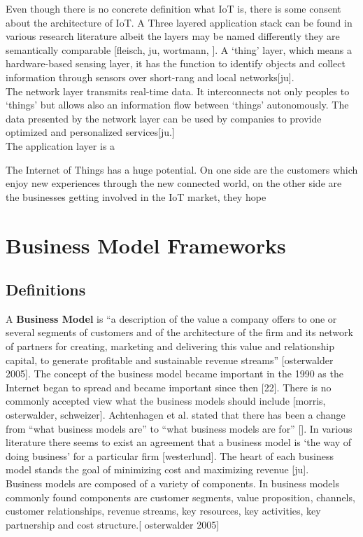 Even though there is no concrete definition what IoT is, there is some consent about the architecture of IoT. A Three layered application stack can be found in various research literature albeit the layers may be named differently they are semantically comparable [fleisch, ju, wortmann, ]. A `thing' layer, which means a hardware-based sensing layer, it has the function to identify objects and collect information through sensors over short-rang and local networks[ju].\\
The network layer transmits real-time data. It interconnects not only peoples to `things' but allows also an information flow between `things' autonomously. The data presented by the network layer can be used by companies to provide optimized and personalized services[ju.]\\
The application layer is a 

The Internet of Things has a huge potential. On one side are the customers which enjoy new experiences through the new connected world, on the other side are the businesses getting involved in the IoT market, they hope 



\section{Business Model Frameworks}
	
	\subsection{Definitions}
	 A \textbf{Business Model} is ``a description of the value a company offers to one or several segments of customers and of the architecture of the firm and its network of partners for creating, marketing and delivering this value and relationship capital, to generate profitable and sustainable revenue streams'' [osterwalder 2005]. The concept of the business model became important in the 1990 as the Internet began to spread and became important since then [22]. There is no commonly accepted view what the business models should include [morris, osterwalder, schweizer]. Achtenhagen et al. stated that there has been a change from ``what business models are'' to ``what business models are for'' []. In various literature there seems to exist an agreement that a business model is `the way of doing business' for a particular firm [westerlund]. The heart of each business model stands the goal of minimizing cost and maximizing revenue [ju].\\
	 Business models are composed of a variety of components. In business models commonly found components are customer segments, value proposition, channels, customer relationships, revenue streams, key resources, key activities, key partnership and cost structure.[ osterwalder 2005]\\

